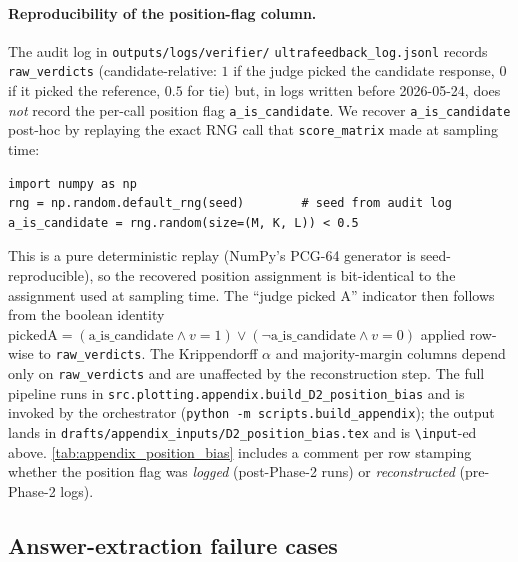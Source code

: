 \paragraph{Reproducibility of the position-flag column.}
The audit log in \texttt{outputs/logs/verifier/}\allowbreak
\texttt{ultrafeedback\_log.jsonl} records \texttt{raw\_verdicts}
(candidate-relative: $1$ if the judge picked the candidate response,
$0$ if it picked the reference, $0.5$ for tie) but, in logs written
before 2026-05-24, does \emph{not} record the per-call position
flag \texttt{a\_is\_candidate}. We recover \texttt{a\_is\_candidate}
post-hoc by replaying the exact RNG call that
\texttt{score\_matrix} made at sampling time:
\begin{lstlisting}[basicstyle=\ttfamily\footnotesize,frame=single,breaklines=true]
import numpy as np
rng = np.random.default_rng(seed)        # seed from audit log
a_is_candidate = rng.random(size=(M, K, L)) < 0.5
\end{lstlisting}
This is a pure deterministic replay (NumPy's PCG-64 generator is
seed-reproducible), so the recovered position assignment is
bit-identical to the assignment used at sampling time. The
``judge picked A'' indicator then follows from the boolean
identity
$\text{pickedA} = (\text{a\_is\_candidate} \wedge v{=}1) \vee
 (\neg\text{a\_is\_candidate} \wedge v{=}0)$
applied row-wise to \texttt{raw\_verdicts}. The Krippendorff
$\alpha$ and majority-margin columns depend only on
\texttt{raw\_verdicts} and are unaffected by the reconstruction
step. The full pipeline runs in
\texttt{src.plotting.appendix.build\_D2\_position\_bias} and is
invoked by the orchestrator
(\texttt{python -m scripts.build\_appendix}); the output lands in
\texttt{drafts/appendix\_inputs/D2\_position\_bias.tex} and is
\texttt{\textbackslash input}-ed above. \cref{tab:appendix_position_bias}
includes a comment per row stamping whether the position flag was
\emph{logged} (post-Phase-2 runs) or \emph{reconstructed}
(pre-Phase-2 logs).

\subsection{Answer-extraction failure cases}


